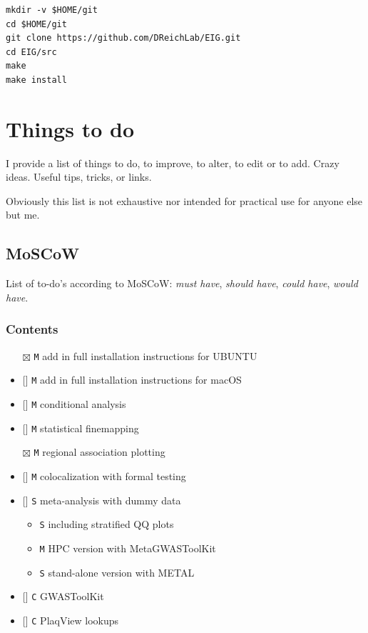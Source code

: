 \documentclass[
]{book}
\newcommand{\passthrough}[1]{#1}
\providecommand{\tightlist}{%
  \setlength{\itemsep}{0pt}\setlength{\parskip}{0pt}}
\begin{document}
\begin{lstlisting}
mkdir -v $HOME/git
cd $HOME/git
git clone https://github.com/DReichLab/EIG.git
cd EIG/src
make
make install
\end{lstlisting}

\hypertarget{todo}{%
\chapter{Things to do}\label{todo}}

I provide a list of things to do, to improve, to alter, to edit or to add. Crazy ideas. Useful tips, tricks, or links.

Obviously this list is not exhaustive nor intended for practical use for anyone else but me.

\hypertarget{moscow}{%
\section{MoSCoW}\label{moscow}}

List of to-do's according to MoSCoW: \emph{must have}, \emph{should have}, \emph{could have}, \emph{would have}.

\hypertarget{contents}{%
\subsection{Contents}\label{contents}}

\begin{itemize}
\tightlist
\item[$\boxtimes$]
  \passthrough{\lstinline!M!} add in full installation instructions for UBUNTU
\item
  {[}{]} \passthrough{\lstinline!M!} add in full installation instructions for macOS
\item
  {[}{]} \passthrough{\lstinline!M!} conditional analysis
\item
  {[}{]} \passthrough{\lstinline!M!} statistical finemapping
\item[$\boxtimes$]
  \passthrough{\lstinline!M!} regional association plotting
\item
  {[}{]} \passthrough{\lstinline!M!} colocalization with formal testing
\item
  {[}{]} \passthrough{\lstinline!S!} meta-analysis with dummy data

  \begin{itemize}
  \tightlist
  \item
    \passthrough{\lstinline!S!} including stratified QQ plots
  \item
    \passthrough{\lstinline!M!} HPC version with MetaGWASToolKit
  \item
    \passthrough{\lstinline!S!} stand-alone version with METAL
  \end{itemize}
\item
  {[}{]} \passthrough{\lstinline!C!} GWASToolKit
\item
  {[}{]} \passthrough{\lstinline!C!} PlaqView lookups
\end{itemize}
\end{document}

